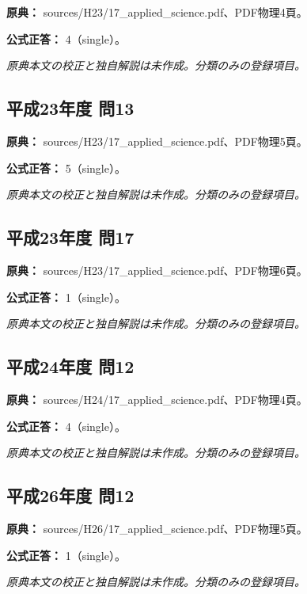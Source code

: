 \noindent\textbf{原典：} sources/H23/17\_applied\_science.pdf、PDF物理4頁。

\textbf{公式正答：} 4（single）。

\par\textit{原典本文の校正と独自解説は未作成。分類のみの登録項目。}

\subsection{平成23年度 問13}
\label{q:h23-reg-applied-13}

\noindent\textbf{原典：} sources/H23/17\_applied\_science.pdf、PDF物理5頁。

\textbf{公式正答：} 5（single）。

\par\textit{原典本文の校正と独自解説は未作成。分類のみの登録項目。}

\subsection{平成23年度 問17}
\label{q:h23-reg-applied-17}

\noindent\textbf{原典：} sources/H23/17\_applied\_science.pdf、PDF物理6頁。

\textbf{公式正答：} 1（single）。

\par\textit{原典本文の校正と独自解説は未作成。分類のみの登録項目。}

\subsection{平成24年度 問12}
\label{q:h24-reg-applied-12}

\noindent\textbf{原典：} sources/H24/17\_applied\_science.pdf、PDF物理4頁。

\textbf{公式正答：} 4（single）。

\par\textit{原典本文の校正と独自解説は未作成。分類のみの登録項目。}

\subsection{平成26年度 問12}
\label{q:h26-reg-applied-12}

\noindent\textbf{原典：} sources/H26/17\_applied\_science.pdf、PDF物理5頁。

\textbf{公式正答：} 1（single）。

\par\textit{原典本文の校正と独自解説は未作成。分類のみの登録項目。}

